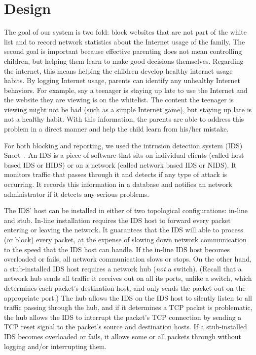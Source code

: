 
\section{Design}

The goal of our system is two fold: block websites that are not part of the
white list and to record network statistics about the Internet usage of the
family. 
%
The second goal is important because effective parenting does not mean
controlling children, but helping them learn to make good decisions
themselves.\cite{severe}
%
Regarding the internet, this means helping the children develop healthy
internet usage habits.
%
By logging Internet usage, parents can identify any unhealthy Internet
behaviors.
%
For example, say a teenager is staying up late to use the Internet and the
website they are viewing is on the whitelist.
%
The content the teenager is viewing might not be bad (such as a simple
Internet game), but staying up late is not a healthy habit.
%
With this information, the parents are able to address this problem in a
direct manner and help the child learn from his/her mistake.

For both blocking and reporting, we used the intrusion detection system (IDS)
Snort~\cite{snort}. An IDS is a piece of software that sits on individual
clients (called host based IDS or HIDS) or on a network (called network based
IDS or NIDS). It monitors traffic that passes through it and detects if any
type of attack is occurring. It records this information in a database
and notifies an network administrator if it detects any serious problems.

The IDS' host can be installed in either of two topological configurations:
in-line and stub.
%
In-line installation requires the IDS host to forward every packet entering or
leaving the network.
%
It guarantees that the IDS will able to process (or block) every packet, at
the expense of slowing down network communication to the speed that the IDS
host can handle.
%
If the in-line IDS host becomes overloaded or fails, all network communication slows
or stops.
%
On the other hand, a stub-installed IDS host requires a network hub (\emph{not} a
switch).
%
(Recall that a network hub sends all traffic it receives out on all its ports,
unlike a switch, which determines each packet's destination host, and only
sends the packet out on the appropriate port.)
%
The hub allows the IDS on the IDS host to silently listen to all traffic
passing through the hub, and if it determines a TCP packet is problematic, the
hub allows the IDS to interrupt the packet's TCP connection by sending a TCP
reset signal to the packet's source and destination hosts.
%
If a stub-installed IDS becomes overloaded or fails, it allows some or all
packets through without logging and/or interrupting them.

